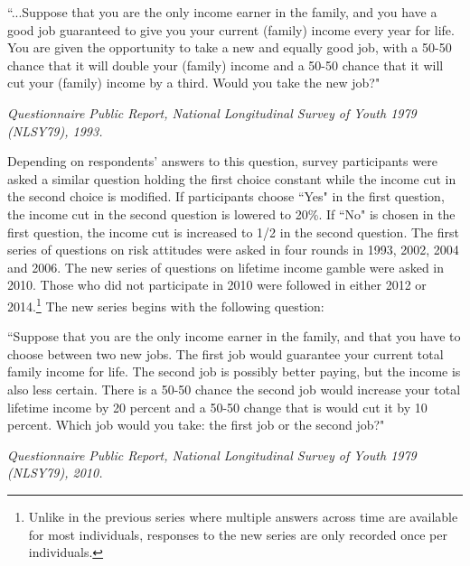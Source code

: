 \documentclass[]{article}
\begin{document}
\begin{center}
	\begin{minipage}[!h]{.9\linewidth}\small
		``...Suppose that you are the only income earner in the family, and you have a good job guaranteed to give you your current (family) income every year for life. You are given the opportunity to take a new and equally good job, with a 50-50 chance that it will double your (family) income and a 50-50 chance that it will cut your (family) income by a third. Would you take the new job?"
	\end{minipage}
\end{center}
\begin{flushright}
	\textit{Questionnaire Public Report, National Longitudinal Survey of Youth 1979 (NLSY79), 1993.}
\end{flushright}
Depending on respondents' answers to this question, survey participants were asked a similar question holding the first choice constant while the income cut in the second choice is modified. If participants choose ``Yes" in the first question, the income cut in the second question is lowered to 20\%. If ``No" is chosen in the first question, the income cut is increased to 1/2 in the second question. The first series of questions on risk attitudes were asked in four rounds in 1993, 2002, 2004 and 2006. The new series of questions on lifetime income gamble were asked in 2010. Those who did not participate in 2010 were followed in either 2012 or 2014.\footnote{Unlike in the previous series where multiple answers across time are available for most individuals, responses to the new series are only recorded once per individuals.} The new series begins with the following question:
\begin{center}
	\begin{minipage}[!h]{.9\linewidth}\small
		``Suppose that you are the only income earner in the family, and that you have to choose between two new jobs. The first job would guarantee your current total family income for life. The second job is possibly better paying, but the income is also less certain. There is a 50-50 chance the second job would increase your total lifetime income by 20 percent and a 50-50 change that is would cut it by 10 percent. Which job would you take: the first job or the second job?"
	\end{minipage}
\end{center}
\begin{flushright}
	\textit{Questionnaire Public Report, National Longitudinal Survey of Youth 1979 (NLSY79), 2010.}
\end{flushright} 
\end{document}
